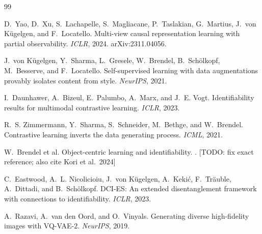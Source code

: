 \documentclass[11pt]{article}
\newcommand{\todo}[1]{{\color{blue}\small[TODO: #1]}}
\begin{document}

\begin{thebibliography}{99}

D.~Yao, D.~Xu, S.~Lachapelle, S.~Magliacane, P.~Taslakian, G.~Martius,
J.~von K\"ugelgen, and F.~Locatello.
\newblock Multi-view causal representation learning with partial observability.
\newblock \emph{ICLR}, 2024. arXiv:2311.04056.

J.~von K\"ugelgen, Y.~Sharma, L.~Gresele, W.~Brendel, B.~Sch\"olkopf,
M.~Besserve, and F.~Locatello.
\newblock Self-supervised learning with data augmentations provably isolates
content from style.
\newblock \emph{NeurIPS}, 2021.

I.~Daunhawer, A.~Bizeul, E.~Palumbo, A.~Marx, and J.~E. Vogt.
\newblock Identifiability results for multimodal contrastive learning.
\newblock \emph{ICLR}, 2023.

R.~S. Zimmermann, Y.~Sharma, S.~Schneider, M.~Bethge, and W.~Brendel.
\newblock Contrastive learning inverts the data generating process.
\newblock \emph{ICML}, 2021.

W.~Brendel et al.
\newblock Object-centric learning and identifiability.
. \todo{fix exact reference; also cite Kori et al.\ 2024}

C.~Eastwood, A.~L. Nicolicioiu, J.~von K\"ugelgen, A.~Keki\'c, F.~Tr\"auble,
A.~Dittadi, and B.~Sch\"olkopf.
\newblock DCI-ES: An extended disentanglement framework with connections to
identifiability.
\newblock \emph{ICLR}, 2023.

A.~Razavi, A.~van den Oord, and O.~Vinyals.
\newblock Generating diverse high-fidelity images with VQ-VAE-2.
\newblock \emph{NeurIPS}, 2019.

\end{thebibliography}
\end{document}
